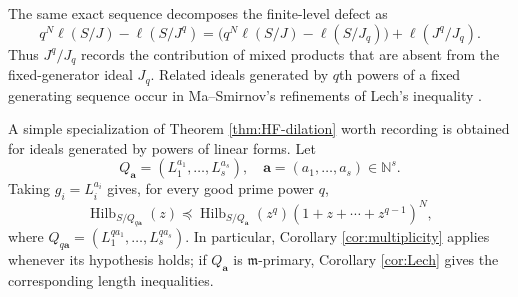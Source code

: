 \documentclass[11pt]{amsart}
\theoremstyle{remark}
\newcommand{\NN}{\mathbb N}
\newcommand{\Hilb}{\operatorname{Hilb}}
\begin{document}
The same exact sequence decomposes the finite-level defect as
$$
q^N\ell(S/J)-\ell(S/J^q)
=
\bigl(q^N\ell(S/J)-\ell(S/J_q)\bigr)
+\ell(J^q/J_q).
$$
Thus $J^q/J_q$ records the contribution of mixed products that are absent from the fixed-generator ideal $J_q$. Related ideals generated by $q$th powers of a fixed generating sequence occur in Ma--Smirnov's refinements of Lech's inequality \cite[Proof of Theorem~17]{MaSmirnov}.

A simple specialization of Theorem \ref{thm:HF-dilation} worth recording is obtained for ideals generated by powers of linear forms. Let
$$
Q_{\mathbf a}=(L_1^{a_1},\ldots,L_s^{a_s}),
\quad
\mathbf a=(a_1,\ldots,a_s)\in\NN^s.
$$
Taking $g_i=L_i^{a_i}$ gives, for every good prime power $q$,
$$
\Hilb_{S/Q_{q\mathbf a}}(z)
\preceq
\Hilb_{S/Q_{\mathbf a}}(z^q)(1+z+\cdots+z^{q-1})^N,
$$
where
$
Q_{q\mathbf a}=(L_1^{qa_1},\ldots,L_s^{qa_s}).
$
In particular, Corollary \ref{cor:multiplicity} applies whenever its hypothesis holds; if $Q_{\mathbf a}$ is $\mathfrak m$-primary, Corollary \ref{cor:Lech} gives the corresponding length inequalities.
\end{document}
